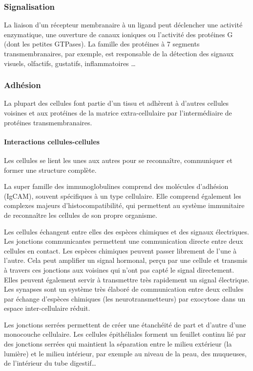 \subsubsection{Signalisation}

La liaison d'un récepteur membranaire à un ligand peut déclencher une activité enzymatique, une ouverture de canaux ioniques ou l'activité des protéines G (dont les petites GTPases). 
La famille des protéines à 7 segments transmembranaires, par exemple, est responsable de la détection des signaux visuels, olfactifs, gustatifs, inflammatoires \dots

\subsubsection{Adhésion}

La plupart des cellules font partie d'un tissu et adhèrent à d'autres cellules voisines et aux protéines de la matrice extra-cellulaire par l'intermédiaire de protéines transmembranaires. 

\paragraph{Interactions cellules-cellules}

Les cellules se lient les unes aux autres pour se reconnaître, communiquer et former une structure complète. 

La super famille des immunoglobulines comprend des molécules d'adhésion (IgCAM), souvent spécifiques à un type cellulaire. Elle comprend également les complexes majeurs d'histocompatibilité, qui permettent au système immunitaire de reconnaître les cellules de son propre organisme. 

Les cellules échangent entre elles des espèces chimiques et des signaux électriques. 
Les jonctions communicantes permettent une communication directe entre deux cellules en contact. Les espèces chimiques peuvent passer librement de l'une à l'autre. Cela peut amplifier un signal hormonal, perçu par une cellule et transmis à travers ces jonctions aux voisines qui n'ont pas capté le signal directement. Elles peuvent également servir à transmettre très rapidement un signal électrique. 
Les synapses sont un système très élaboré de communication entre deux cellules par échange d'espèces chimiques (les neurotransmetteurs) par exocytose dans un espace inter-cellulaire réduit. 

Les jonctions serrées permettent de créer une étanchéité de part et d'autre d'une monocouche cellulaire. Les cellules épithéliales forment un feuillet continu lié par des jonctions serrées qui maintient la séparation entre le milieu extérieur (la lumière) et le milieu intérieur, par exemple au niveau de la peau, des muqueuses, de l'intérieur du tube digestif\dots

